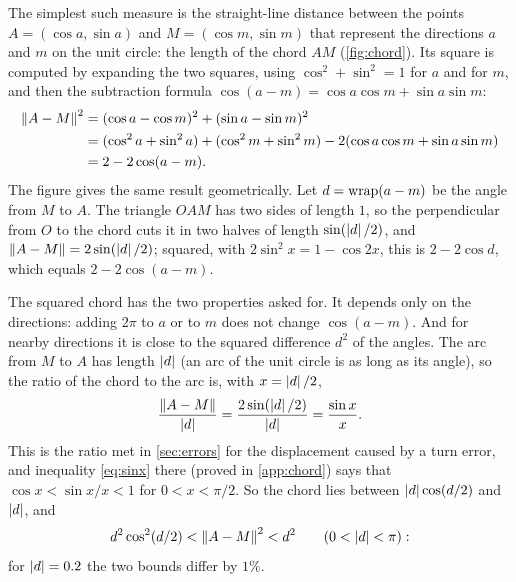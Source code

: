 The simplest such measure is the straight-line distance between the
points $A=(\cos a,\sin a)$ and $M=(\cos m,\sin m)$ that represent the
directions $a$ and $m$ on the unit circle: the length of the chord $AM$
(\cref{fig:chord}). Its square is computed by expanding the two squares,
using $\cos^2+\sin^2=1$ for $a$ and for $m$, and then the subtraction
formula $\cos(a-m)=\cos a\cos m+\sin a\sin m$:
\begin{align*}
  \left\lVert A-M\right\rVert^2&=(\cos a-\cos m)^2+(\sin a-\sin m)^2\\
  &=(\cos^2a+\sin^2a)+(\cos^2m+\sin^2m)
    -2(\cos a\cos m+\sin a\sin m)\\
  &=2-2\cos(a-m).
\end{align*}
The figure gives the same result geometrically. Let $d=\operatorname{wrap}(a-m)$ be the
angle from $M$ to $A$. The triangle $OAM$ has two sides of length $1$, so
the perpendicular from $O$ to the chord cuts it in two halves of length
$\sin(\left\lvert d\right\rvert/2)$, and $\left\lVert A-M\right\rVert=2\sin(\left\lvert d\right\rvert/2)$; squared, with
$2\sin^2x=1-\cos2x$, this is $2-2\cos d$, which equals $2-2\cos(a-m)$.

The squared chord has the two properties asked for. It depends only on
the directions: adding $2\pi$ to $a$ or to $m$ does not change
$\cos(a-m)$. And for nearby directions it is close to the squared
difference $d^2$ of the angles. The arc from $M$ to $A$ has length
$\left\lvert d\right\rvert$ (an arc of the unit circle is as long as its angle), so the
ratio of the chord to the arc is, with $x=\left\lvert d\right\rvert/2$,
\[
  \frac{\left\lVert A-M\right\rVert}{\left\lvert d\right\rvert}=\frac{2\sin(\left\lvert d\right\rvert/2)}{\left\lvert d\right\rvert}
  =\frac{\sin x}{x}.
\]
This is the ratio met in \cref{sec:errors} for the displacement caused by
a turn error, and inequality \eqref{eq:sinx} there (proved in
\cref{app:chord}) says that $\cos x<\sin x/x<1$ for $0<x<\pi/2$. So the
chord lies between $\left\lvert d\right\rvert\cos(d/2)$ and $\left\lvert d\right\rvert$, and
\[
  d^2\cos^2(d/2)<\left\lVert A-M\right\rVert^2<d^2\qquad(0<\left\lvert d\right\rvert<\pi):
\]
for $\left\lvert d\right\rvert=0.2$ the two bounds differ by $1\%$.

